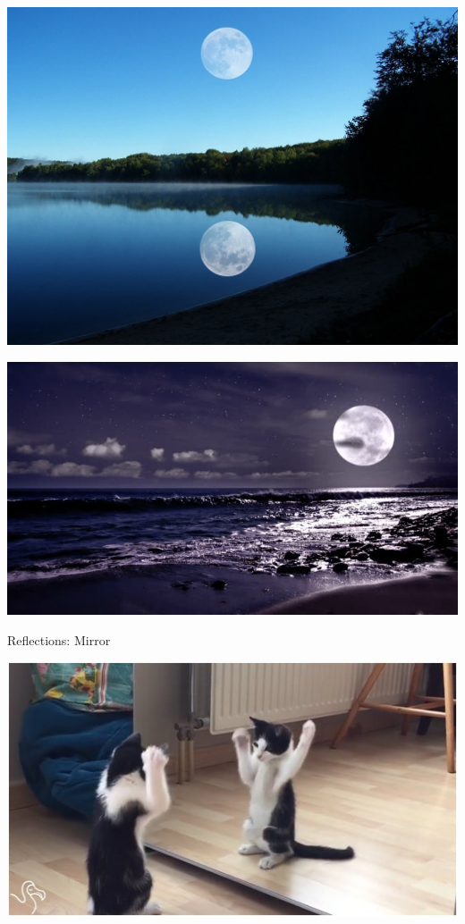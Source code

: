\documentclass{beamer}
\begin{document}
\begin{frame}
	\begin{center}
		\includegraphics[scale=0.3]{11.jpeg}
	\end{center}
\end{frame}

\begin{frame}
	\begin{center}
		\includegraphics[scale=0.5]{12.jpeg}
	\end{center}
\end{frame}

\begin{frame}{Reflections: Mirror}
	\begin{center}
		\includegraphics[scale=0.5]{14.jpeg}
	\end{center}
\end{frame}
\end{document}
